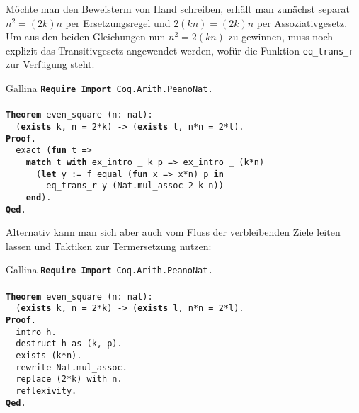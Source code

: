 \documentclass[8pt]{beamer}
\newcommand{\kw}[1]{\textbf{#1}}
\begin{document}
\begin{frame}
Möchte man den Beweisterm von Hand schreiben, erhält man zunächst
separat $n^2 = (2k)n$ per Ersetzungsregel und $2(kn) = (2k)n$
per Assoziativgesetz. Um aus den beiden Gleichungen nun
$n^2 = 2(kn)$ zu gewinnen, muss noch explizit das
Transitivgesetz angewendet werden, wofür die Funktion
\texttt{eq\_trans\_r} zur Verfügung steht.\pause

\begin{block}{Gallina}
\texttt{\kw{Require} \kw{Import} Coq.Arith.PeanoNat.\\
\mbox{}\\
\kw{Theorem} even\_square (n: nat):\\
\ \ (\kw{exists} k, n = 2*k) -> (\kw{exists} l, n*n = 2*l).\\
\kw{Proof}.\\
\ \ exact (\kw{fun} t =>\\
\ \ \ \ \kw{match} t \kw{with} ex\_intro \_ k p => ex\_intro \_ (k*n)\\
\ \ \ \ \ \ (\kw{let} y := f\_equal (\kw{fun} x => x*n) p \kw{in}\\
\ \ \ \ \ \ \ \ eq\_trans\_r y (Nat.mul\_assoc 2 k n))\\
\ \ \ \ \kw{end}).\\
\kw{Qed}.}
\end{block}
\end{frame}

\begin{frame}
Alternativ kann man sich aber auch vom Fluss der verbleibenden
Ziele leiten lassen und Taktiken zur Termersetzung nutzen:
\begin{block}{Gallina}
\texttt{\kw{Require} \kw{Import} Coq.Arith.PeanoNat.\\
\mbox{}\\
\kw{Theorem} even\_square (n: nat):\\
\ \ (\kw{exists} k, n = 2*k) -> (\kw{exists} l, n*n = 2*l).\\
\kw{Proof}.\\
\ \ intro h.\\
\ \ destruct h as (k, p).\\
\ \ exists (k*n).\\
\ \ rewrite Nat.mul\_assoc.\\
\ \ replace (2*k) with n.\\
\ \ reflexivity.\\
\kw{Qed}.}
\end{block}
\end{frame}
\end{document}
